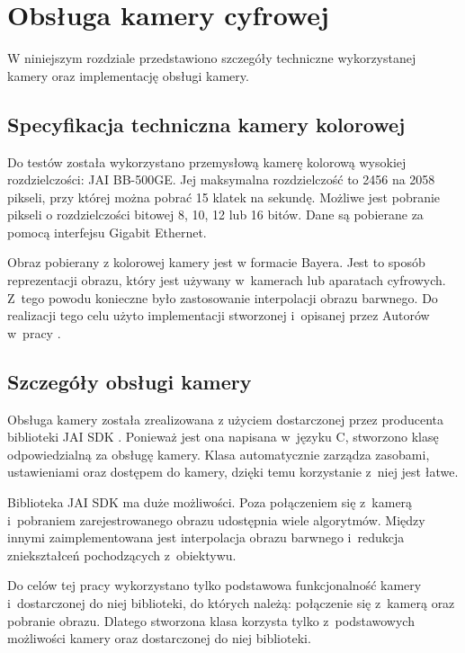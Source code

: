 \chapter{Obsługa kamery cyfrowej}
\label{cha:obslugakamery}

W niniejszym rozdziale przedstawiono szczegóły techniczne wykorzystanej kamery oraz implementację obsługi kamery.

\section{Specyfikacja techniczna kamery kolorowej}
\label{sec:specyfikacjaKamery}

Do testów została wykorzystano przemysłową kamerę kolorową wysokiej rozdzielczości: JAI BB-500GE. Jej maksymalna rozdzielczość to 2456 na 2058 pikseli, przy której można pobrać 15 klatek na sekundę. Możliwe jest pobranie pikseli o rozdzielczości bitowej 8, 10, 12 lub 16 bitów. Dane są pobierane za pomocą interfejsu Gigabit Ethernet. 

Obraz pobierany z kolorowej kamery jest w formacie Bayera. Jest to sposób reprezentacji obrazu, który jest używany w~kamerach lub aparatach cyfrowych. Z~tego powodu konieczne było zastosowanie interpolacji obrazu barwnego. Do realizacji tego celu użyto implementacji stworzonej i~opisanej przez Autorów w~pracy \cite{BFIOCL}.

\section{Szczegóły obsługi kamery}
\label{sec:szczegolyObslugiKamery}

Obsługa kamery została zrealizowana z użyciem dostarczonej przez producenta biblioteki JAI SDK \cite{JAISDK}. Ponieważ jest ona napisana w~języku C, stworzono klasę odpowiedzialną za obsługę kamery. Klasa automatycznie zarządza zasobami, ustawieniami oraz dostępem do kamery, dzięki temu korzystanie z~niej jest łatwe.

Biblioteka JAI SDK ma duże możliwości. Poza połączeniem się z~kamerą i~pobraniem zarejestrowanego obrazu udostępnia wiele algorytmów. Między innymi zaimplementowana jest interpolacja obrazu barwnego i~redukcja zniekształceń pochodzących z~obiektywu.

Do celów tej pracy wykorzystano tylko podstawowa funkcjonalność kamery i~dostarczonej do niej biblioteki, do których należą: połączenie się z~kamerą oraz pobranie obrazu. Dlatego stworzona klasa korzysta tylko z~podstawowych możliwości kamery oraz dostarczonej do niej biblioteki.

